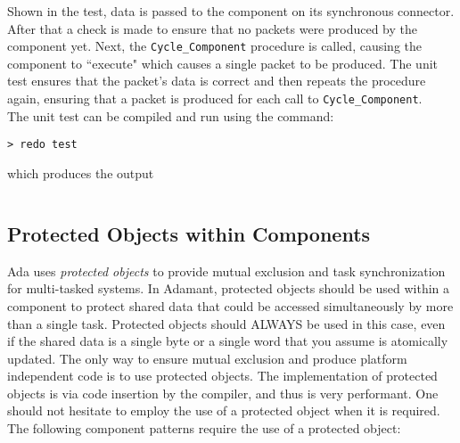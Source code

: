 Shown in the test, data is passed to the component on its synchronous connector. After that a check is made to ensure that no packets were produced by the component yet. Next, the \texttt{Cycle\_Component} procedure is called, causing the component to ``execute" which causes a single packet to be produced. The unit test ensures that the packet's data is correct and then repeats the procedure again, ensuring that a packet is produced for each call to \texttt{Cycle\_Component}. \\

The unit test can be compiled and run using the command:

\vspace{5mm} %
\begin{verbatim}
> redo test
\end{verbatim}
\vspace{5mm} %

which produces the output

\vspace{5mm} %
\inputminted{text}{../example_architecture/background_component/test/output.txt}
\vspace{5mm} %

\subsection{Protected Objects within Components}

Ada uses \textit{protected objects} to provide mutual exclusion and task synchronization for multi-tasked systems. In Adamant, protected objects should be used within a component to protect shared data that could be accessed simultaneously by more than a single task. Protected objects should ALWAYS be used in this case, even if the shared data is a single byte or a single word that you assume is atomically updated. The only way to ensure mutual exclusion and produce platform independent code is to use protected objects. The implementation of protected objects is via code insertion by the compiler, and thus is very performant. One should not hesitate to employ the use of a protected object when it is required. \\

The following component patterns require the use of a protected object:

